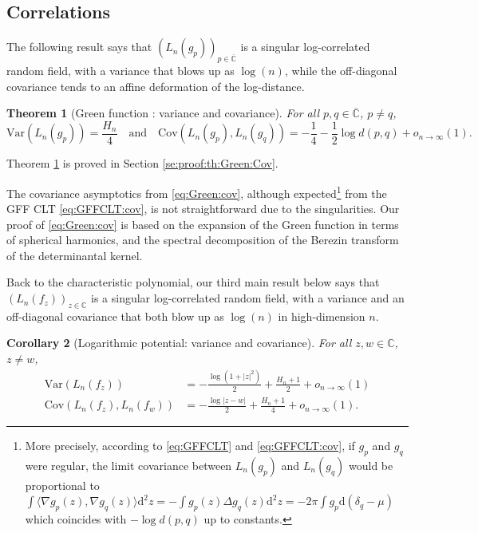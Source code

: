 \documentclass[10pt,reqno]{amsart}
\numberwithin{equation}{section}
\numberwithin{figure}{section}
\theoremstyle{plain}
\newtheorem{theorem}{Theorem}[section]
\newtheorem{corollary}[theorem]{Corollary}
\newcommand{\<}{\langle}
\renewcommand{\>}{\rangle}
\begin{document}
\subsection{Correlations}

The following result says that ${(L_n(g_p))}_{p\in\overline{\mathbb{C}}}$ is a singular log-correlated random field, with a variance that blows up as $\log(n)$, while the off-diagonal covariance tends to an affine deformation of the log-distance.

\begin{theorem}[Green function : variance and covariance]\label{th:Green:Cov}
 For all $p,q\in\overline{\mathbb{C}}$, $p\neq q$, 
 \begin{equation}
 \mathrm{Var}(L_n(g_p))
 =\frac{H_n}{4}
 \quad\text{and}\quad 
 \mathrm{Cov}(L_n(g_p),L_n(g_q))
  =-\frac{1}{4}-\frac{1}{2}\log d(p,q)+o_{n\to\infty}(1)\label{eq:Green:cov}.
 \end{equation}
\end{theorem}

Theorem \ref{th:Green:Cov} is proved in Section \ref{se:proof:th:Green:Cov}.

%
The covariance asymptotics from \eqref{eq:Green:cov}, although expected\footnote{More precisely, according to \eqref{eq:GFFCLT} and \eqref{eq:GFFCLT:cov}, if $g_p$ and $g_q$ were regular, the limit covariance between $L_n(g_p)$ and $L_n(g_q)$ 
would be proportional to $\int\langle \nabla g_p(z), \nabla g_q(z) \rangle\mathrm{d}^2z=-\int g_p(z) \Delta g_q(z)\mathrm{d}^2z= -2\pi\int g_p \mathrm d (\delta_q - \mu)$ which coincides with $-\log d(p,q)$ up to constants.} from the GFF CLT \eqref{eq:GFFCLT:cov}, is not straightforward due to the singularities. Our proof of \eqref{eq:Green:cov} is based on the expansion of the Green function in terms of spherical harmonics, and the spectral decomposition of the Berezin transform of the determinantal kernel. 
%

Back to the characteristic polynomial, our third main result below says that ${(L_n(f_z))}_{z\in\mathbb{C}}$ is a singular log-correlated random field, with a variance and an off-diagonal covariance that both blow up as $\log(n)$ in high-dimension $n$.

\begin{corollary}[Logarithmic potential: variance and covariance]\label{co:LogPot:Cov}
  For all $z,w\in\mathbb{C}$, $z\neq w$, 
  \begin{align}    
    \mathrm{Var}(L_n(f_z))
	  &= -\frac{\log(1+|z|^2)}{2}+\frac{H_n+1}{2}+o_{n\to\infty}(1)\label{eq:LogPot:var}\\
    \mathrm{Cov}(L_n(f_z),L_n(f_w))
    &=-\frac{\log|z-w|}{2}+\frac{H_n+1}{4}+o_{n\to\infty}(1).\label{eq:LogPot:cov}
  \end{align}
\end{corollary}
\end{document}
